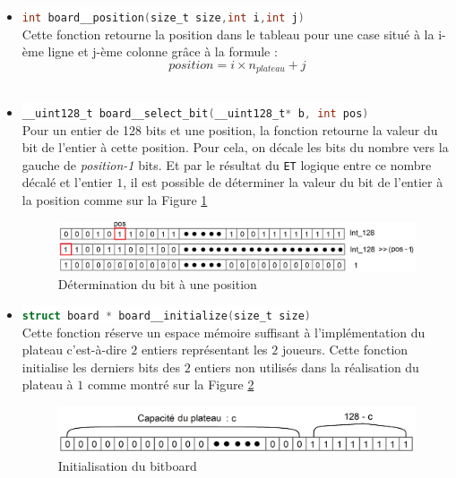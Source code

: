 \documentclass[a4paper,11pt]{article}
\newcommand{\inlinecode}[2]{\colorbox{white}{\lstinline[language=#1]$#2$}}
\begin{document}
\begin{itemize}
    \item[$\bullet$]
    \inlinecode{C}{int board__position(size_t size,int i,int j)}
     \\ Cette fonction retourne la position dans le tableau pour une case situé à la i-ème ligne et j-ème colonne grâce à la formule :
    \begin{equation}
    \label{eq:position}
    position = i\times n_{plateau}+j
    \end{equation}
    \\
    \item[$\bullet$]
    \inlinecode{C}{__uint128_t board__select_bit(__uint128_t* b, int pos)}
    \\ Pour un entier de 128 bits et une position, la fonction retourne la valeur du bit de l'entier à cette position. Pour cela, on décale les bits du nombre vers la gauche de \textit{position-1} bits. Et par le résultat du \verb+ET+ logique entre ce nombre décalé et l'entier $1$, il est possible de déterminer la valeur du bit de l'entier à la position comme sur la Figure \ref{fig:selectbit}
    \begin{figure}[h]
    \centering
    \includegraphics[scale=0.20]{board_select_bit.png}
    \caption{Détermination du bit à une position}
    \label{fig:selectbit}
    \end{figure}
    \item[$\bullet$]
    \inlinecode{C}{struct board * board__initialize(size_t size)}
    \\ Cette fonction réserve un espace mémoire suffisant à l’implémentation du plateau c'est-à-dire $2$ entiers représentant les $2$ joueurs. Cette fonction initialise les derniers bits des $2$ entiers non utilisés dans la réalisation du plateau à $1$ comme montré sur la Figure \ref{fig:boardinit}
    \begin{figure}[h]
    \centering
    \includegraphics[scale=0.20]{Birboard_init.png}
    \caption{Initialisation du bitboard}
    \label{fig:boardinit}
    \end{figure}

\end{itemize}
\end{document}
